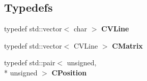 \subsection*{Typedefs}
\begin{DoxyCompactItemize}
\item 
\hypertarget{namespace_chase_game_aa09cf1806d3b1f59d36cfabadeaca6a2}{typedef std\-::vector$<$ char $>$ {\bfseries C\-V\-Line}}\label{namespace_chase_game_aa09cf1806d3b1f59d36cfabadeaca6a2}

\item 
\hypertarget{namespace_chase_game_a469449f9237e59efce3982127366c550}{typedef std\-::vector$<$ C\-V\-Line $>$ {\bfseries C\-Matrix}}\label{namespace_chase_game_a469449f9237e59efce3982127366c550}

\item 
\hypertarget{namespace_chase_game_a1b3968a11187d602af99b05239720bd3}{typedef std\-::pair$<$ unsigned, \\*
unsigned $>$ {\bfseries C\-Position}}\label{namespace_chase_game_a1b3968a11187d602af99b05239720bd3}

\end{DoxyCompactItemize}
